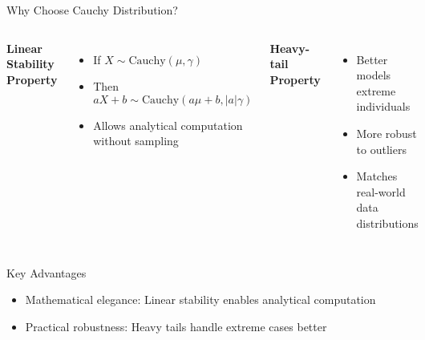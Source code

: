 \documentclass[aspectratio=169,10pt]{beamer}
\begin{document}
\begin{frame}{Why Choose Cauchy Distribution?}
\begin{columns}
\textbf{Linear Stability Property}
\begin{itemize}
    \item If $X \sim \text{Cauchy}(\mu, \gamma)$
    \item Then $aX + b \sim \text{Cauchy}(a\mu + b, |a|\gamma)$
    \item Allows analytical computation without sampling
\end{itemize}

\textbf{Heavy-tail Property}
\begin{itemize}
    \item Better models extreme individuals
    \item More robust to outliers
    \item Matches real-world data distributions
\end{itemize}

\begin{center}
\end{center}
\end{columns}

\vspace{1em}
\begin{alertblock}{Key Advantages}
\begin{itemize}
    \item Mathematical elegance: Linear stability enables analytical computation
    \item Practical robustness: Heavy tails handle extreme cases better
\end{itemize}
\end{alertblock}
\end{frame}
\end{document}

